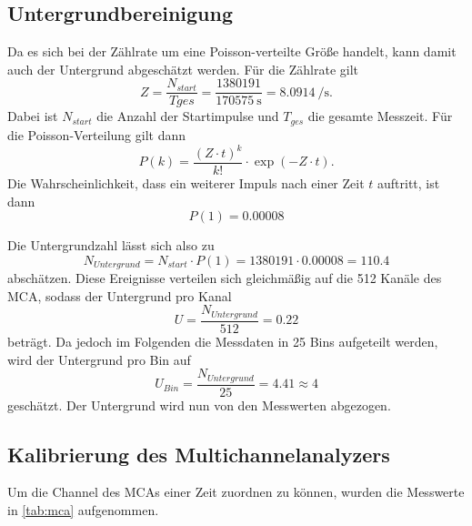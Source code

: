 \subsection{Untergrundbereinigung}

Da es sich bei der Zählrate um eine Poisson-verteilte Größe handelt, kann damit auch der Untergrund abgeschätzt werden. 
Für die Zählrate gilt
\begin{equation*}
  Z = \frac{N_{start}}{T{ges}} = \frac{1380191}{\SI{170575}{\s}} = \SI{8.0914}{\per\s}.
\end{equation*}
Dabei ist $N_{start}$ die Anzahl der Startimpulse und $T_{ges}$ die gesamte Messzeit. Für die Poisson-Verteilung gilt dann 
\begin{equation*}
  P(k) = \frac{(Z \cdot t)^k}{k!} \cdot \exp(-Z \cdot t).
\end{equation*}
Die Wahrscheinlichkeit, dass ein weiterer Impuls nach einer Zeit $t$ auftritt, ist dann
\begin{equation*}
  P(1) = 0.00008
\end{equation*}

Die Untergrundzahl lässt sich also zu
\begin{equation*}
  N_{Untergrund} = N_{start} \cdot P(1) = 1380191 \cdot 0.00008 = 110.4
\end{equation*}
abschätzen. Diese Ereignisse verteilen sich gleichmäßig auf die 512 Kanäle des MCA, sodass der Untergrund pro Kanal
\begin{equation*}
  U = \frac{N_{Untergrund}}{512} = 0.22
\end{equation*}
beträgt. Da jedoch im Folgenden die Messdaten in 25 Bins aufgeteilt werden, wird der Untergrund pro Bin auf
\begin{equation*}
  U_{Bin} = \frac{N_{Untergrund}}{25} = 4.41 \approx 4
\end{equation*}
geschätzt. Der Untergrund wird nun von den Messwerten abgezogen.

\subsection{Kalibrierung des Multichannelanalyzers}

Um die Channel des MCAs einer Zeit zuordnen zu können, wurden die Messwerte in \autoref{tab:mca} aufgenommen.

